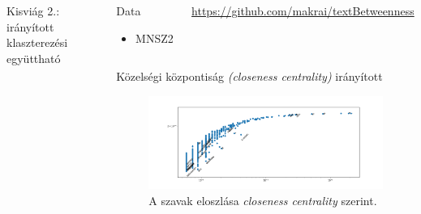 \documentclass{beamer}
\newlength{\sepwid}
\newlength{\onecolwid}
\newlength{\twocolwid}
\begin{document}
\begin{frame}[t]
\begin{columns}[t]
\begin{column}{\onecolwid}
\begin{block}{Kisviág 2.: irányított klaszterezési együttható}
\begin{figure}
            \end{figure}
          \end{block}
    \end{column}

    \begin{column}{\sepwid} \end{column}			%


      \begin{column}{\twocolwid} %
        \begin{columns}
          \begin{column}{.5\columnwidth}
            \begin{block}{Data}
              \begin{itemize}
                \item
                  MNSZ2 \citep{oravecz2014hungarian}
              \end{itemize}
            \end{block}
          \end{column}
          \begin{column}{.5\columnwidth}
            \url{https://github.com/makrai/textBetweenness}
          \end{column}
        \end{columns}
        \begin{block}{Közelségi központiság \emph{(closeness centrality)}}
          irányított
          \begin{figure}[h]
            \begin{center}
              \includegraphics[width=\columnwidth]{current-flow-closeness.png}
                  \caption{A szavak eloszlása \emph{closeness centrality} szerint.}
            \end{center}
                \label{fig:closeness}
          \end{figure}
        \end{block}


\end{column}
\end{columns}
\end{frame}
\end{document}
